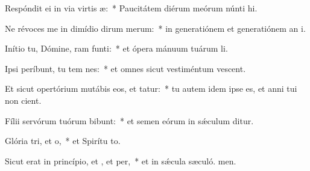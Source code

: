 \item Respóndit ei in via virtis æ:~* Paucitátem diérum meórum núnti hi.
\item Ne révoces me in dimídio dirum merum:~* in generatiónem et generatiónem an i.
\item Inítio tu, Dómine, ram funti:~* et ópera mánuum tuárum  li.
\item Ipsi períbunt, tu tem nes:~* et omnes sicut vestiméntum vescent.
\item Et sicut opertórium mutábis eos, et tatur:~* tu autem idem ipse es, et anni tui non cient.
\item Fílii servórum tuórum bibunt:~* et semen eórum in sǽculum ditur.
\item Glória tri, et o,~* et Spirítu to.
\item Sicut erat in princípio, et , et per,~* et in sǽcula sæculó. men.
